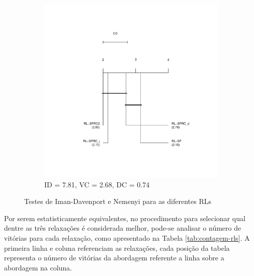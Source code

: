 \begin{figure}[!ht]
    \centering
    \begin{subfigure}{.5\textwidth}
        \centering
        \includegraphics[scale=0.6]{imagens/rls.pdf}
        \vspace*{-2cm}
        \caption{ID = 7.81, VC = 2.68, DC = 0.74}
    \end{subfigure}
    \caption{Testes  de  Iman-Davenport  e   Nemenyi  para  as
diferentes RLs}
    \label{fig:rl-nemenyi}
\end{figure}

Por serem  estatisticamente equivalentes,  no procedimento para  selecionar qual
dentre as  três relaxações é  considerada melhor,  pode-se analisar o  número de
vitórias para cada relaxação, como apresentado na Tabela \ref{tab:contagem-rls}.
A primeira  linha e  coluna referenciam  as relaxações,  cada posição  da tabela
representa o número de vitórias da abordagem referente a linha sobre a abordagem
na coluna.

\begin{table}[!ht]
\centering
{}
\caption{Contagem de vitórias entre as RLs.}
\label{tab:contagem-rls}
\end{table}


